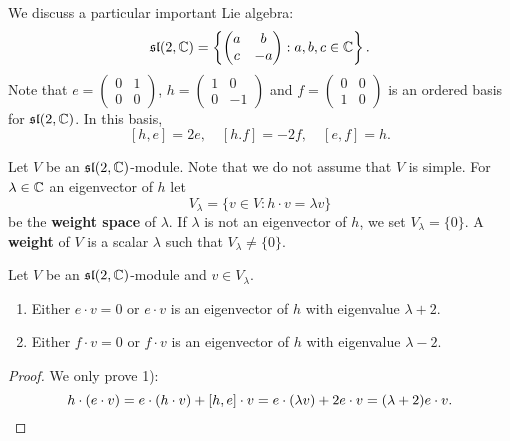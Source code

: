 \chapter{}


We discuss a particular important Lie algebra: 
\[
\mathfrak{sl}(2,\mathbb{C})=\left\{\begin{pmatrix}
    a & b\\
    c & -a
    \end{pmatrix}:a,b,c\in\mathbb{C}\right\}.
\]
Note that 
$e=\begin{pmatrix}
        0&1\\
        0&0\end{pmatrix}$, $h=\begin{pmatrix}
        1&0\\
        0&-1\end{pmatrix}$ and $f=\begin{pmatrix}0&0\\1&0\end{pmatrix}$ 
        is an ordered basis for $\mathfrak{sl}(2,\mathbb{C})$. In this basis,
\[
[h,e]=2e,\quad
[h.f]=-2f,\quad
[e,f]=h.
\]

Let $V$ be an $\mathfrak{sl}(2,\mathbb{C})$-module. Note that we do not assume that $V$ is simple. 
For $\lambda\in\mathbb{C}$ an eigenvector of $h$ let
\[
V_{\lambda}=\{v\in V:h\cdot v=\lambda v\}
\]
be the \textbf{weight space} of $\lambda$. 
If $\lambda$ is not an eigenvector of $h$, 
we set $V_{\lambda}=\{0\}$. A \textbf{weight} of $V$  
is a scalar $\lambda$ such that $V_{\lambda}\ne\{0\}$. 

\begin{lemma}
    Let $V$ be an $\mathfrak{sl}(2,\mathbb{C})$-module and $v\in V_{\lambda}$. 
    \begin{enumerate}
        \item Either $e\cdot v=0$ or $e\cdot v$ is an eigenvector of $h$ with
            eigenvalue $\lambda+2$.
        \item Either $f\cdot v=0$ or $f\cdot v$ is an eigenvector of $h$ with
            eigenvalue $\lambda-2$.
    \end{enumerate} 
\end{lemma}

\begin{proof}
    We only prove 1):
    \[h\cdot(e\cdot v)=e\cdot(h\cdot v)+[h,e]\cdot v=e\cdot(\lambda v)+2e\cdot v=(\lambda+2)e\cdot v.\qedhere
    \]
\end{proof}

